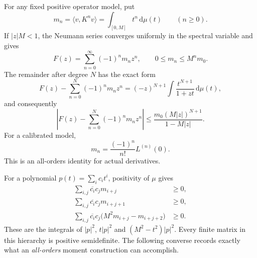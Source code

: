 \documentclass[11pt,a4paper]{article}
\numberwithin{equation}{section}
\theoremstyle{definition}
\theoremstyle{remark}
\newcommand{\ip}[2]{\langle #1,#2\rangle}
\newcommand{\dd}{\,\mathrm d}
\begin{document}
For any fixed positive operator model, put
\begin{equation}\label{eq:moments}
m_n=\ip v{K^nv}=\int_{[0,M]}t^n\dd\mu(t)\qquad(n\geq0).
\end{equation}
If $|z|M<1$, the Neumann series converges uniformly in the spectral
variable and gives
\begin{equation}\label{eq:moment-series}
F(z)=\sum_{n=0}^{\infty}(-1)^nm_nz^n,
\qquad0\leq m_n\leq M^n m_0.
\end{equation}
The remainder after degree $N$ has the exact form
\begin{equation}\label{eq:moment-remainder}
F(z)-\sum_{n=0}^N(-1)^nm_nz^n
=(-z)^{N+1}\int\frac{t^{N+1}}{1+zt}\dd\mu(t),
\end{equation}
and consequently
\begin{equation}\label{eq:moment-bound}
\left|F(z)-\sum_{n=0}^N(-1)^nm_nz^n\right|
\leq\frac{m_0(M|z|)^{N+1}}{1-M|z|}.
\end{equation}
For a calibrated model,
\begin{equation}\label{eq:actual-moments}
m_n=\frac{(-1)^n}{n!}L^{(n)}(0).
\end{equation}
This is an all-orders identity for actual derivatives.

For a polynomial $p(t)=\sum_i c_it^i$, positivity of $\mu$ gives
\begin{align}
\sum_{i,j}\overline{c_i}c_jm_{i+j}&\geq0,\label{eq:H0}\\
\sum_{i,j}\overline{c_i}c_jm_{i+j+1}&\geq0,\label{eq:H1}\\
\sum_{i,j}\overline{c_i}c_j
\bigl(M^2m_{i+j}-m_{i+j+2}\bigr)&\geq0.\label{eq:H2}
\end{align}
These are the integrals of $|p|^2$, $t|p|^2$ and
$(M^2-t^2)|p|^2$. Every finite matrix in this hierarchy is positive
semidefinite. The following converse records exactly what an
\emph{all-orders} moment construction can accomplish.
\end{document}
